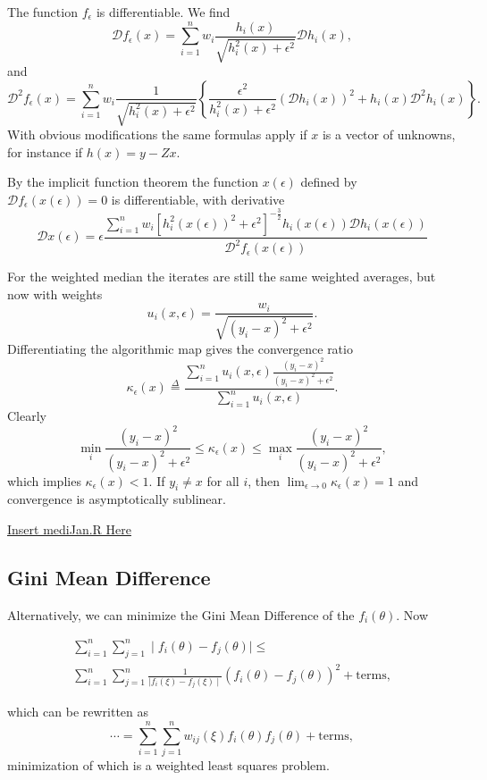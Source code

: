 \documentclass[
  12pt,
]{book}
\begin{document}
The function \(f_\epsilon\) is differentiable. We find
\[
\mathcal{D}f_\epsilon(x)=\sum_{i=1}^n w_i\frac{h_i(x)}{\sqrt{h_i^2(x)+\epsilon^2}}\mathcal{D}h_i(x),
\]
and
\[
\mathcal{D}^2f_\epsilon(x)=\sum_{i=1}^n w_i\frac{1}{\sqrt{h_i^2(x)+\epsilon^2}}
\left\{\frac{\epsilon^2}{h_i^2(x)+\epsilon^2}\left(\mathcal{D}h_i(x)\right)^2+h_i(x)\mathcal{D}^2h_i(x)\right\}.
\]
With obvious modifications the same formulas apply if \(x\) is a vector of unknowns, for instance if \(h(x)=y-Zx\).

By the implicit function theorem the function \(x(\epsilon)\) defined
by \(\mathcal{D}f_\epsilon(x(\epsilon))=0\) is differentiable, with derivative
\[
\mathcal{D}x(\epsilon)=\epsilon\frac{\sum_{i=1}^nw_i\left[h_i^2(x(\epsilon))^2+\epsilon^2\right]^{-\frac32}h_i(x(\epsilon))\mathcal{D}h_i(x(\epsilon))}{\mathcal{D}^2f_\epsilon(x(\epsilon))}
\]

For the weighted median the iterates are still the same weighted averages, but now with weights
\[
u_i(x,\epsilon)=\frac{w_i}{\sqrt{(y_i-x)^2+\epsilon^2}}.
\]
Differentiating the algorithmic map gives the convergence ratio
\[
\kappa_\epsilon(x)\mathop{=}\limits^{\Delta}\frac{\sum_{i=1}^n u_i(x,\epsilon)\frac{(y_i-x)^2}{(y_i-x)^2+\epsilon^2}}{\sum_{i=1}^n u_i(x,\epsilon)}.
\]
Clearly
\[
\min_i\frac{(y_i-x)^2}{(y_i-x)^2+\epsilon^2}\leq\kappa_\epsilon(x)\leq\max_i\frac{(y_i-x)^2}{(y_i-x)^2+\epsilon^2},
\]
which implies \(\kappa_\epsilon(x)< 1.\) If \(y_i\not=x\) for all \(i\), then \(\lim_{\epsilon\rightarrow 0}\kappa_\epsilon(x)=1\) and convergence is asymptotically sublinear.

\href{../code/mediJan.R}{Insert mediJan.R Here}

\hypertarget{gini-mean-difference}{%
\subsection{Gini Mean Difference}\label{gini-mean-difference}}

Alternatively, we can minimize the Gini Mean Difference of the \(f_i(\theta).\)
Now

\begin{multline*}
\sum_{i=1}^n\sum_{j=1}^n\mid f_i(\theta)-f_j(\theta)\mid \leq\\
\sum_{i=1}^n\sum_{j=1}^n\frac{1}{\mid f_i(\xi)-f_j(\xi)\mid}
(f_i(\theta)-f_j(\theta))^2 + \text{terms},
\end{multline*}

which can be rewritten as
\[
\cdots=\sum_{i=1}^n\sum_{j=1}^n
w_{ij}(\xi)f_i(\theta)f_j(\theta)+\text{terms},
\]
minimization of which is a weighted least squares problem.
\end{document}

